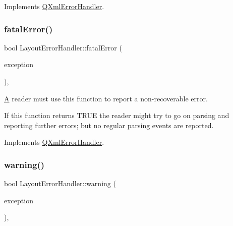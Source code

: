 Implements \mbox{\hyperlink{class_q_xml_error_handler_a7b265803d41782e6207b497fe09beff0}{Q\+Xml\+Error\+Handler}}.

\mbox{\label{class_layout_error_handler_aca31cecb0d737ede70e22c86d038bbb4}} 
\subsubsection{\texorpdfstring{fatalError()}{fatalError()}}
{\footnotesize\ttfamily bool Layout\+Error\+Handler\+::fatal\+Error (\begin{DoxyParamCaption}\item[{const \mbox{\hyperlink{class_q_xml_parse_exception}{Q\+Xml\+Parse\+Exception}} \&}]{exception }\end{DoxyParamCaption})\hspace{0.3cm}{\ttfamily [inline]}, {\ttfamily [virtual]}}

\mbox{\hyperlink{class_a}{A}} reader must use this function to report a non-\/recoverable error.

If this function returns T\+R\+UE the reader might try to go on parsing and reporting further errors; but no regular parsing events are reported. 

Implements \mbox{\hyperlink{class_q_xml_error_handler_aaa8c1ad1b42a5257cf2344c7fe101797}{Q\+Xml\+Error\+Handler}}.

\mbox{\label{class_layout_error_handler_a463dfca8796fee3c40a08817d1af64be}} 
\subsubsection{\texorpdfstring{warning()}{warning()}}
{\footnotesize\ttfamily bool Layout\+Error\+Handler\+::warning (\begin{DoxyParamCaption}\item[{const \mbox{\hyperlink{class_q_xml_parse_exception}{Q\+Xml\+Parse\+Exception}} \&}]{exception }\end{DoxyParamCaption})\hspace{0.3cm}{\ttfamily [inline]}, {\ttfamily [virtual]}}

